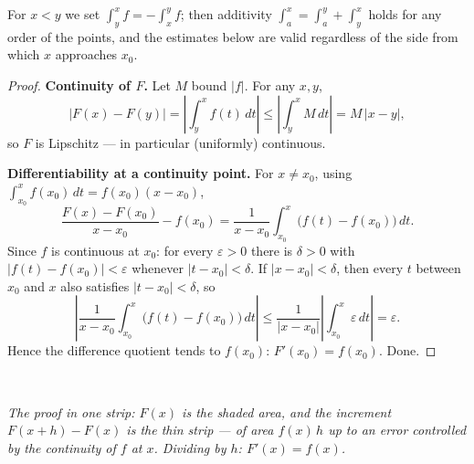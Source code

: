\documentclass[11pt]{report}
\newcommand{\figcap}[1]{\\[1.5mm]\parbox{0.92\textwidth}{\small\itshape #1}}
\begin{document}
\begin{rembox}
For $x < y$ we set $\int_y^x f = -\int_x^y f$; then additivity $\int_a^x = \int_a^y + \int_y^x$ holds for any order of the points, and the estimates below are valid regardless of the side from which $x$ approaches $x_0$.
\end{rembox}

\begin{proof}
\textbf{Continuity of $F$.} Let $M$ bound $|f|$. For any $x, y$,
\[
|F(x) - F(y)| = \left| \int_y^x f(t)\,dt \right| \leq \left| \int_y^x M\,dt \right| = M\,|x - y|,
\]
so $F$ is Lipschitz --- in particular (uniformly) continuous.

\textbf{Differentiability at a continuity point.} For $x \neq x_0$, using $\int_{x_0}^x f(x_0)\,dt = f(x_0)(x - x_0)$,
\[
\frac{F(x) - F(x_0)}{x - x_0} - f(x_0) = \frac{1}{x - x_0}\int_{x_0}^x \bigl( f(t) - f(x_0) \bigr)\,dt.
\]
Since $f$ is continuous at $x_0$: for every $\varepsilon > 0$ there is $\delta > 0$ with $|f(t) - f(x_0)| < \varepsilon$ whenever $|t - x_0| < \delta$. If $|x - x_0| < \delta$, then every $t$ between $x_0$ and $x$ also satisfies $|t - x_0| < \delta$, so
\[
\left| \frac{1}{x - x_0}\int_{x_0}^x \bigl(f(t) - f(x_0)\bigr)\,dt \right| \leq \frac{1}{|x - x_0|} \left| \int_{x_0}^x \varepsilon\,dt \right| = \varepsilon.
\]
Hence the difference quotient tends to $f(x_0)$: $F'(x_0) = f(x_0)$. Done.
\end{proof}

\begin{center}
\figcap{The proof in one strip: $F(x)$ is the shaded area, and the increment $F(x+h) - F(x)$ is the thin strip --- of area $f(x)\,h$ up to an error controlled by the continuity of $f$ at $x$. Dividing by $h$: $F'(x) = f(x)$.}
\end{center}
\end{document}
